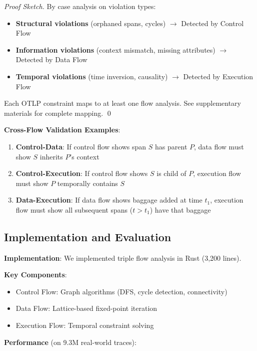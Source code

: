 \begin{proof}[Proof Sketch]
By case analysis on violation types:
\begin{itemize}
\item \textbf{Structural violations} (orphaned spans, cycles) $\rightarrow$ Detected by Control Flow
\item \textbf{Information violations} (context mismatch, missing attributes) $\rightarrow$ Detected by Data Flow
\item \textbf{Temporal violations} (time inversion, causality) $\rightarrow$ Detected by Execution Flow
\end{itemize}

Each OTLP constraint maps to at least one flow analysis. See supplementary materials for complete mapping. \qed
\end{proof}

\textbf{Cross-Flow Validation Examples}:

\begin{enumerate}
\item \textbf{Control-Data}: If control flow shows span $S$ has parent $P$, data flow must show $S$ inherits $P$'s context
\item \textbf{Control-Execution}: If control flow shows $S$ is child of $P$, execution flow must show $P$ temporally contains $S$
\item \textbf{Data-Execution}: If data flow shows baggage added at time $t_1$, execution flow must show all subsequent spans ($t > t_1$) have that baggage
\end{enumerate}

\subsection{Implementation and Evaluation}
\label{sec:triple-flow-implementation}

\textbf{Implementation}: We implemented triple flow analysis in Rust (3,200 lines).

\textbf{Key Components}:
\begin{itemize}
\item Control Flow: Graph algorithms (DFS, cycle detection, connectivity)
\item Data Flow: Lattice-based fixed-point iteration
\item Execution Flow: Temporal constraint solving
\end{itemize}

\textbf{Performance} (on 9.3M real-world traces):

